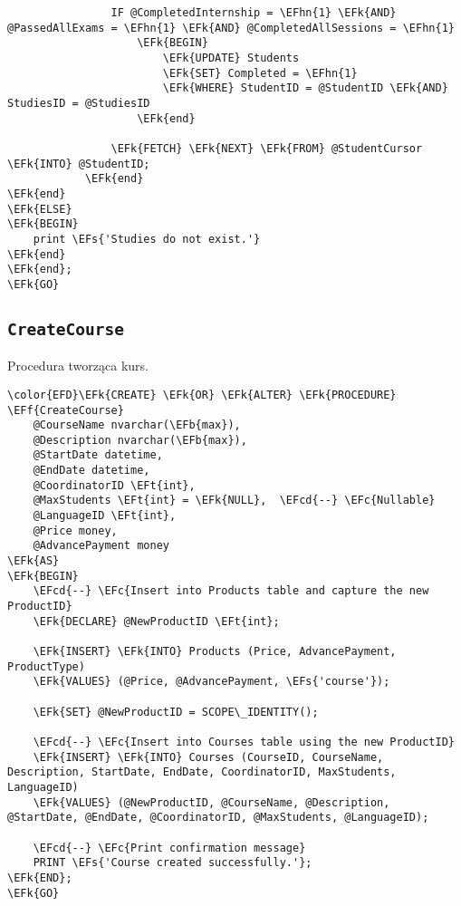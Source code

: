 \documentclass[11pt]{article}
\newcommand{\EFc}[1]{\textcolor{EFc}{\textit{#1}}} %
\newcommand{\EFcd}[1]{\textcolor{EFcd}{\textit{#1}}} %
\newcommand{\EFs}[1]{\textcolor{EFs}{#1}} %
\newcommand{\EFk}[1]{\textcolor{EFk}{\textbf{#1}}} %
\newcommand{\EFb}[1]{\textcolor{EFb}{\textbf{#1}}} %
\newcommand{\EFf}[1]{\textcolor{EFf}{#1}} %
\newcommand{\EFt}[1]{\textcolor{EFt}{\textbf{#1}}} %
\newcommand{\EFhn}[1]{\textcolor{EFhn}{#1}} %
\begin{document}
\begin{Code}
\begin{Verbatim}
                IF @CompletedInternship = \EFhn{1} \EFk{AND} @PassedAllExams = \EFhn{1} \EFk{AND} @CompletedAllSessions = \EFhn{1}
                    \EFk{BEGIN}
                        \EFk{UPDATE} Students
                        \EFk{SET} Completed = \EFhn{1}
                        \EFk{WHERE} StudentID = @StudentID \EFk{AND} StudiesID = @StudiesID
                    \EFk{end}

                \EFk{FETCH} \EFk{NEXT} \EFk{FROM} @StudentCursor \EFk{INTO} @StudentID;
            \EFk{end}
\EFk{end}
\EFk{ELSE}
\EFk{BEGIN}
    print \EFs{'Studies do not exist.'}
\EFk{end}
\EFk{end};
\EFk{GO}
\end{Verbatim}
\end{Code}
\subsection{\texttt{CreateCourse}}
\label{sec:orgac1c358}
Procedura tworząca kurs.
\begin{Code}
\begin{Verbatim}
\color{EFD}\EFk{CREATE} \EFk{OR} \EFk{ALTER} \EFk{PROCEDURE} \EFf{CreateCourse}
    @CourseName nvarchar(\EFb{max}),
    @Description nvarchar(\EFb{max}),
    @StartDate datetime,
    @EndDate datetime,
    @CoordinatorID \EFt{int},
    @MaxStudents \EFt{int} = \EFk{NULL},  \EFcd{--} \EFc{Nullable}
    @LanguageID \EFt{int},
    @Price money,
    @AdvancePayment money
\EFk{AS}
\EFk{BEGIN}
    \EFcd{--} \EFc{Insert into Products table and capture the new ProductID}
    \EFk{DECLARE} @NewProductID \EFt{int};

    \EFk{INSERT} \EFk{INTO} Products (Price, AdvancePayment, ProductType)
    \EFk{VALUES} (@Price, @AdvancePayment, \EFs{'course'});

    \EFk{SET} @NewProductID = SCOPE\_IDENTITY();

    \EFcd{--} \EFc{Insert into Courses table using the new ProductID}
    \EFk{INSERT} \EFk{INTO} Courses (CourseID, CourseName, Description, StartDate, EndDate, CoordinatorID, MaxStudents, LanguageID)
    \EFk{VALUES} (@NewProductID, @CourseName, @Description, @StartDate, @EndDate, @CoordinatorID, @MaxStudents, @LanguageID);

    \EFcd{--} \EFc{Print confirmation message}
    PRINT \EFs{'Course created successfully.'};
\EFk{END};
\EFk{GO}
\end{Verbatim}
\end{Code}
\end{document}
